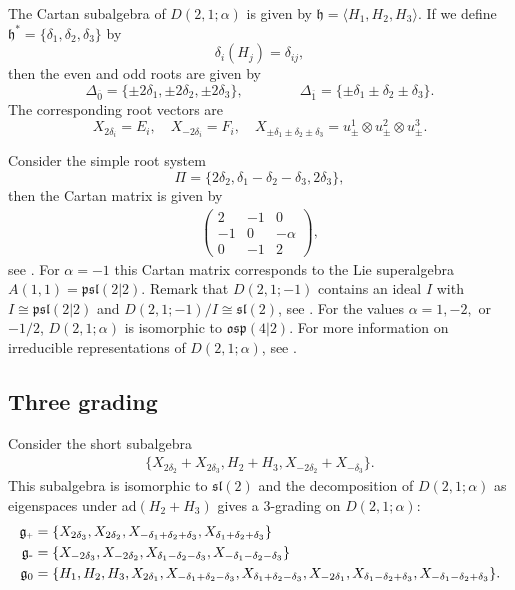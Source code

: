 \documentclass{amsart}
\numberwithin{theorem}{section}
\theoremstyle{definition}
\theoremstyle{remark}
\newcommand{\ol}[1]{\overline{#1}}
\newcommand{\g}{{\mathfrak{g}}}
\newcommand{\dea}{{\delta_1}}
\newcommand{\deb}{{\delta_2}}
\newcommand{\dec}{{\delta_3}}
\newcommand{\minus}{\scalebox{0.9}{{\rm -}}}
\newcommand{\plus}{\scalebox{0.6}{{\rm+}}}
\begin{document}
The Cartan subalgebra of $D(2,1;\alpha)$ is given by $\mathfrak{h}=\langle H_1,H_2,H_3 \rangle.$ If we define $\mathfrak{h}^\ast=\{\dea,\deb, \dec \}$ by \[
\delta_i (H_j) = \delta_{ij},\]
then the even and odd roots are given by
\[
\Delta_{\ol 0} = \{ \pm 2\dea, \pm 2\deb , \pm 2\dec \}, \qquad \qquad \Delta_{\ol 1} = \{ \pm \dea \pm \deb \pm \dec \}.
\]
The corresponding root vectors are \[
X_{2\delta_i} = E_i, \quad X_{-2\delta_i} = F_i, \quad X_{\pm\dea\pm\deb\pm\dec} = u_{\pm}^1 \otimes u_{\pm}^2 \otimes u_{\pm}^3.
\]

Consider the simple root system 
\[
\Pi = \{ 2\deb, \dea-\deb-\dec, 2\dec \},
\]
then the Cartan matrix is given by
\begin{align*}
\begin{pmatrix}
2 & -1 & 0 \\
-1 & 0 & -\alpha \\
0 &-1 & 2
\end{pmatrix},
\end{align*}
see \cite[Sections 4.2 and 5.3.1]{Mu}. For $\alpha=-1$ this Cartan matrix corresponds to the Lie superalgebra $A(1,1)=\mathfrak{psl}(2|2)$. 
Remark that $D(2,1;-1)$ contains an ideal $I$ with $I \cong \mathfrak{psl}(2|2) $ and $D(2,1;-1)/ I \cong \mathfrak{sl}(2)$, see \cite{Se}.  
For the values $\alpha= 1,-2,$ or $-1/2$, $D(2,1;\alpha)$ is isomorphic to $\mathfrak{osp}(4|2)$.
For more information on irreducible representations of $D(2,1;\alpha)$, see \cite{Jo}.

\subsection{Three grading}\label{Three grading}

Consider the short subalgebra  
\begin{align}\label{Eqsl2triple}
\{ X_{2\deb} + X_{2\dec}, H_{2}+ H_{3}, X_{-2\deb}+X_{-\dec} \}.
\end{align}
This subalgebra is isomorphic to $\mathfrak{sl}(2)$ and the decomposition of $D(2,1;\alpha)$ as eigenspaces under ad$(H_{2}+H_{3})$ gives a $3$-grading on $D(2,1;\alpha)$:
\begin{align*} 
\g_{\plus} &= \{ X_{2\dec} ,  X_{2\deb}, X_{-\dea+\deb+\dec} ,X_{\dea+\deb+\dec}\} \\
\g_{\minus} &=\{ X_{-2\dec} ,  X_{-2\deb},X_{\dea-\deb-\dec}, X_{-\dea-\deb-\dec} \}  \\
\g_0 &=  \{   H_1, H_2,H_3, X_{2\dea}, X_{-\dea+\deb-\dec},X_{\dea+\deb-\dec},X_{-2\dea}, X_{\dea-\deb+\dec},X_{-\dea-\deb+\dec} \}.
\end{align*}
\end{document}
